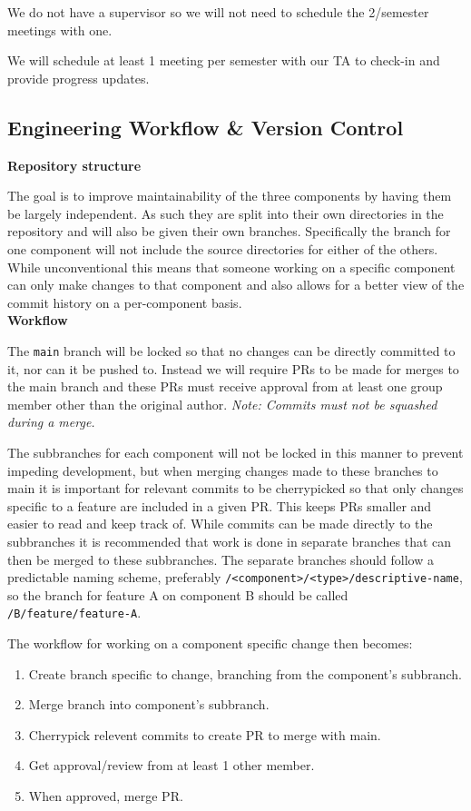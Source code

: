 \documentclass{article}
\begin{document}
We do not have a supervisor so we will not need to schedule the 2/semester meetings with one.

We will schedule at least 1 meeting per semester with our TA to check-in and provide progress updates.

\subsection{Engineering Workflow \& Version Control}

\textbf{Repository structure}

The goal is to improve maintainability of the three components by having them be largely independent. As such they are split into their own directories in the repository and will also be given their own branches. Specifically the branch for one component will not include the source directories for either of the others. While unconventional this means that someone working on a specific component can only make changes to that component and also allows for a better view of the commit history on a per-component basis. \\

\textbf{Workflow}

The \texttt{main} branch will be locked so that no changes can be directly committed to it, nor can it be pushed to. Instead we will require PRs to be made for merges to the main branch and these PRs must receive approval from at least one group member other than the original author. \textit{Note: Commits must not be squashed during a merge.}

The subbranches for each component will not be locked in this manner to prevent impeding development, but when merging changes made to these branches to main it is important for relevant commits to be cherrypicked so that only changes specific to a feature are included in a given PR. This keeps PRs smaller and easier to read and keep track of. While commits can be made directly to the subbranches it is recommended that work is done in separate branches that can then be merged to these subbranches. The separate branches should follow a predictable naming scheme, preferably \texttt{/<component>/<type>/descriptive-name}, so the branch for feature A on component B should be called \texttt{/B/feature/feature-A}.

The workflow for working on a component specific change then becomes:
\begin{enumerate}
\item Create branch specific to change, branching from the component's subbranch.
\item Merge branch into component's subbranch.
\item Cherrypick relevent commits to create PR to merge with main.
\item Get approval/review from at least 1 other member.
\item When approved, merge PR.
\end{enumerate}
\end{document}
